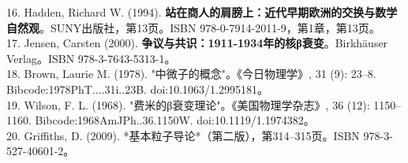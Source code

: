 16. Hadden, Richard W. (1994). \textbf{站在商人的肩膀上：近代早期欧洲的交换与数学自然观}。SUNY出版社，第13页。ISBN 978-0-7914-2011-9，第1章，第13页。\\
17. Jensen, Carsten (2000). \textbf{争议与共识：1911-1934年的核β衰变}。Birkhäuser Verlag。ISBN 978-3-7643-5313-1。\\
18. Brown, Laurie M. (1978). "中微子的概念"。《今日物理学》, 31 (9): 23–8. Bibcode:1978PhT....31i..23B. doi:10.1063/1.2995181。\\
19. Wilson, F. L. (1968). "费米的β衰变理论"。《美国物理学杂志》, 36 (12): 1150–1160. Bibcode:1968AmJPh..36.1150W. doi:10.1119/1.1974382。\\
20. Griffiths, D. (2009). *基本粒子导论*（第二版），第314–315页。ISBN 978-3-527-40601-2。\\